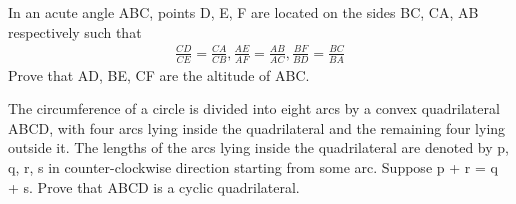 \item In an acute angle ABC, points D, E, F are located on the sides BC, CA, AB respectively such that 
\begin{align*}
\frac{CD}{CE} = \frac{CA}{CB}, \frac{AE}{AF} = \frac{AB}{AC}, \frac{BF}{BD} = \frac{BC}{BA}
\end{align*}
Prove that AD, BE, CF are the altitude of ABC.

\item The circumference of a circle is divided into eight arcs by a convex quadrilateral ABCD, with
four arcs lying inside the quadrilateral and the remaining four lying outside it. The lengths of
the arcs lying inside the quadrilateral are denoted by p, q, r, s in counter-clockwise direction
starting from some arc. Suppose p + r = q + s. Prove that ABCD is a cyclic quadrilateral.

